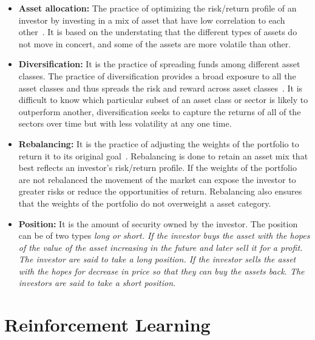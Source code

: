 \begin{itemize}
	\item \textbf{Asset allocation:} The practice of optimizing the risk/return profile of an investor by investing in a mix of asset that have low correlation to each other~\cite{reilly2011investment}. It is based on the understating that the different types of assets do not move in concert, and some of the assets are more volatile than other. 
	
	\item \textbf{Diversification:} It is the  practice of spreading funds among different asset classes. The practice of diversification provides a broad exposure to all the asset classes and thus spreads the risk and reward across asset classes~\cite{reilly2011investment}. It is difficult to know which particular subset of an asset class or sector is likely to outperform another, diversification seeks to capture the returns of all of the sectors over time but with less volatility at any one time.
	
	\item\textbf{Rebalancing:} It is the practice of adjusting the weights of the portfolio to return it to its original goal~\cite{reilly2011investment}. Rebalancing is done to retain an asset mix that best reflects an investor's risk/return profile. If the weights of the portfolio are not rebalanced the movement of the market can expose the investor to greater risks or reduce the opportunities of return. Rebalancing also ensures that the weights of the portfolio do not overweight a asset category.
	
	\item\textbf{Position:} It is the amount of security owned by the investor. The position can be of two types \em{long} or \em{short}. If the investor buys the asset with the hopes of the value of the asset increasing in the future and later sell it for a profit. The investor are said to take a long position. If the investor sells the asset with the hopes for decrease in price so that they can buy the assets back. The investors are said to take a short position.
	
\end{itemize}
 
 
\section{Reinforcement Learning}


